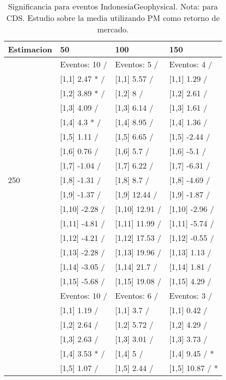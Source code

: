 \begin{table}

\caption{Significancia para eventos IndonesiaGeophysical. Nota: para CDS. Estudio sobre la media utilizando PM como retorno de mercado.}
\centering
\begin{tabular}[t]{llll}
\toprule
Estimacion & 50 & 100 & 150\\
\midrule
 & Eventos:  10 / & Eventos:  5 / & Eventos:  4 /\\
 & {}[1,1] 2.47 * / & {}[1,1] 5.57  / & {}[1,1] 1.29  /\\
 & {}[1,2] 3.89 * / & {}[1,2] 8  / & {}[1,2] 2.61  /\\
 & {}[1,3] 4.09  / & {}[1,3] 6.14  / & {}[1,3] 1.61  /\\
 & {}[1,4] 4.3 * / & {}[1,4] 8.95  / & {}[1,4] 1.36  /\\
\addlinespace
 & {}[1,5] 1.11  / & {}[1,5] 6.65  / & {}[1,5] -2.44  /\\
 & {}[1,6] 0.76  / & {}[1,6] 5.7  / & {}[1,6] -5.1  /\\
 & {}[1,7] -1.04  / & {}[1,7] 6.22  / & {}[1,7] -6.31  /\\
250 & {}[1,8] -1.31  / & {}[1,8] 8.7  / & {}[1,8] -4.69  /\\
 & {}[1,9] -1.37  / & {}[1,9] 12.44  / & {}[1,9] -1.87  /\\
\addlinespace
 & {}[1,10] -2.28  / & {}[1,10] 12.91  / & {}[1,10] -2.96  /\\
 & {}[1,11] -4.81  / & {}[1,11] 11.99  / & {}[1,11] -5.74  /\\
 & {}[1,12] -4.21  / & {}[1,12] 17.53  / & {}[1,12] -0.55  /\\
 & {}[1,13] -2.28  / & {}[1,13] 19.96  / & {}[1,13] 1.13  /\\
 & {}[1,14] -3.05  / & {}[1,14] 21.7  / & {}[1,14] 1.81  /\\
\addlinespace
 & {}[1,15] -5.68  / & {}[1,15] 19.08  / & {}[1,15] 4.29  /\\
 & Eventos:  10 / & Eventos:  6 / & Eventos:  3 /\\
 & {}[1,1] 1.19  / & {}[1,1] 3.7  / & {}[1,1] 0.42  /\\
 & {}[1,2] 2.64  / & {}[1,2] 5.72  / & {}[1,2] 4.29  /\\
 & {}[1,3] 2.63  / & {}[1,3] 3.01  / & {}[1,3] 3.73  /\\
\addlinespace
 & {}[1,4] 3.53 * / & {}[1,4] 5  / & {}[1,4] 9.45  / *\\
 & {}[1,5] 1.07  / & {}[1,5] 2.44  / & {}[1,5] 10.87  / *\\

\end{tabular}
\end{table}
